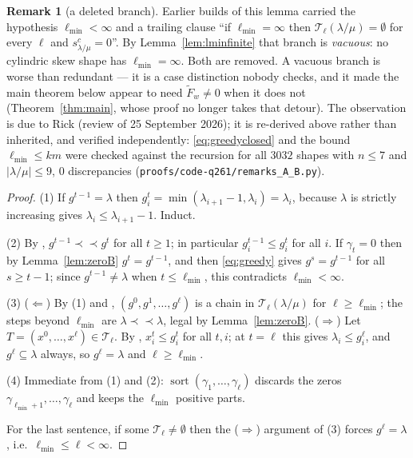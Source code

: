 \documentclass[11pt]{article}
\theoremstyle{plain}
\theoremstyle{definition}
\newtheorem{rem}[thm]{Remark}
\DeclareMathOperator{\sort}{sort}
\newcommand{\Fw}{\widetilde{F}_{w}}
\newcommand{\hstrip}{\prec\!\!\prec}
\begin{document}
\begin{rem}[a deleted branch]\label{rem:deadbranch}
Earlier builds of this lemma carried the hypothesis $\ell_{\min}<\infty$ and a trailing clause
``if $\ell_{\min}=\infty$ then $\mathcal T_\ell(\lambda/\mu)=\emptyset$ for every $\ell$ and
$s^{c}_{\lambda/\mu}=0$''. By Lemma~\ref{lem:lminfinite} that branch is \emph{vacuous}: no
cylindric skew shape has $\ell_{\min}=\infty$. Both are removed. A vacuous branch is worse than
redundant --- it is a case distinction nobody checks, and it made the main theorem below
appear to need $\Fw\ne0$ when it does not (Theorem~\ref{thm:main}, whose proof no longer takes that detour). The observation is due to Rick (review of 25
September 2026); it is re-derived above rather than inherited, and verified independently:
\eqref{eq:greedyclosed} and the bound $\ell_{\min}\le km$ were checked against the recursion for
all $3032$ shapes with $n\le7$ and $|\lambda/\mu|\le9$, $0$ discrepancies
(\texttt{proofs/code-q261/remarks\_A\_B.py}).
\end{rem}

\begin{proof}
(1) If $g^{t-1}=\lambda$ then $g^{t}_i=\min(\lambda_{i+1}-1,\lambda_i)=\lambda_i$, because
$\lambda$ is strictly increasing gives $\lambda_i\le\lambda_{i+1}-1$. Induct.

(2) By \cite[Lem.~5.2(1)]{Clio2026}, $g^{t-1}\hstrip g^{t}$ for all $t\ge1$; in particular
$g^{t-1}_i\le g^{t}_i$ for all $i$. If $\gamma_t=0$ then by Lemma~\ref{lem:zeroB}
$g^{t}=g^{t-1}$, and then \eqref{eq:greedy} gives $g^{s}=g^{t-1}$ for all $s\ge t-1$; since
$g^{t-1}\ne\lambda$ when $t\le\ell_{\min}$, this contradicts $\ell_{\min}<\infty$.

(3) ($\Leftarrow$) By (1) and \cite[Lem.~5.2(1)]{Clio2026}, $(g^0,g^1,\dots,g^{\ell})$ is a
chain in $\mathcal T_\ell(\lambda/\mu)$ for $\ell\ge\ell_{\min}$; the steps beyond
$\ell_{\min}$ are $\lambda\hstrip\lambda$, legal by Lemma~\ref{lem:zeroB}.
($\Rightarrow$) Let $T=(x^0,\dots,x^\ell)\in\mathcal T_\ell$. By
\cite[Lem.~5.2(3)]{Clio2026}, $x^{t}_i\le g^{t}_i$ for all $t,i$; at $t=\ell$ this gives
$\lambda_i\le g^{\ell}_i$, and $g^{\ell}\subseteq\lambda$ always, so $g^{\ell}=\lambda$ and
$\ell\ge\ell_{\min}$.

(4) Immediate from (1) and (2): $\sort(\gamma_1,\dots,\gamma_\ell)$ discards the zeros
$\gamma_{\ell_{\min}+1},\dots,\gamma_\ell$ and keeps the $\ell_{\min}$ positive parts.

For the last sentence, if some $\mathcal T_\ell\ne\emptyset$ then the ($\Rightarrow$) argument
of (3) forces $g^{\ell}=\lambda$, i.e.\ $\ell_{\min}\le\ell<\infty$.
\end{proof}
\end{document}
